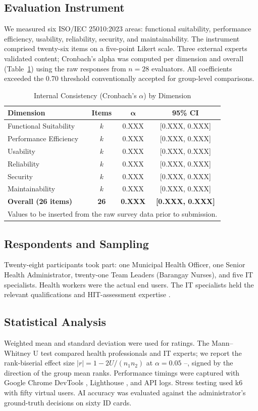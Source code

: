\documentclass[conference]{IEEEtran}
\begin{document}
\subsection{Evaluation Instrument}
We measured six ISO/IEC 25010:2023 areas: functional suitability, performance efficiency, usability, reliability, security, and maintainability. The instrument comprised twenty-six items on a five-point Likert scale. Three external experts validated content; Cronbach's alpha was computed per dimension and overall (Table~\ref{tab:cronbach}) using the raw responses from $n = 28$ evaluators. All coefficients exceeded the 0.70 threshold conventionally accepted for group-level comparisons.

\begin{table}[!t]
\caption{Internal Consistency (Cronbach's $\alpha$) by Dimension}
\label{tab:cronbach}
\centering
\begin{tabular}{|l|c|c|c|}
\hline
\textbf{Dimension} & \textbf{Items} & $\boldsymbol{\alpha}$ & \textbf{95\% CI} \\
\hline
Functional Suitability & $k$ & 0.XXX & [0.XXX, 0.XXX] \\
\hline
Performance Efficiency & $k$ & 0.XXX & [0.XXX, 0.XXX] \\
\hline
Usability & $k$ & 0.XXX & [0.XXX, 0.XXX] \\
\hline
Reliability & $k$ & 0.XXX & [0.XXX, 0.XXX] \\
\hline
Security & $k$ & 0.XXX & [0.XXX, 0.XXX] \\
\hline
Maintainability & $k$ & 0.XXX & [0.XXX, 0.XXX] \\
\hline
\textbf{Overall (26 items)} & \textbf{26} & \textbf{0.XXX} & \textbf{[0.XXX, 0.XXX]} \\
\hline
\multicolumn{4}{l}{\footnotesize Values to be inserted from the raw survey data prior to submission.}
\end{tabular}
\end{table}

\subsection{Respondents and Sampling}
Twenty-eight participants took part: one Municipal Health Officer, one Senior Health Administrator, twenty-one Team Leaders (Barangay Nurses), and five IT specialists. Health workers were the actual end users. The IT specialists held the relevant qualifications and HIT-assessment expertise \cite{b34}.

\subsection{Statistical Analysis}
Weighted mean and standard deviation were used for ratings. The Mann--Whitney U test compared health professionals and IT experts; we report the rank-biserial effect size $|r| = 1 - 2U/(n_1 n_2)$ at $\alpha = 0.05$ \cite{b35}--\cite{b37}, signed by the direction of the group mean ranks. Performance timings were captured with Google Chrome DevTools \cite{b49}, Lighthouse \cite{b48}, and API logs. Stress testing used k6 \cite{b47} with fifty virtual users. AI accuracy was evaluated against the administrator's ground-truth decisions on sixty ID cards.
\end{document}
